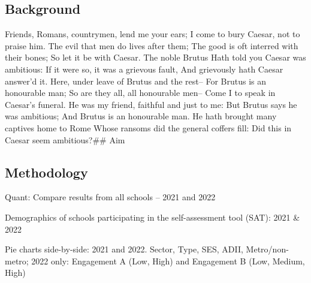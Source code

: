 \documentclass[
  letterpaper,
  DIV=11,
  numbers=noendperiod]{scrartcl}
\begin{document}
\hypertarget{background}{%
\subsection{Background}\label{background}}

Friends, Romans, countrymen, lend me your ears; I come to bury Caesar,
not to praise him. The evil that men do lives after them; The good is
oft interred with their bones; So let it be with Caesar. The noble
Brutus Hath told you Caesar was ambitious: If it were so, it was a
grievous fault, And grievously hath Caesar answer'd it. Here, under
leave of Brutus and the rest-- For Brutus is an honourable man; So are
they all, all honourable men-- Come I to speak in Caesar's funeral. He
was my friend, faithful and just to me: But Brutus says he was
ambitious; And Brutus is an honourable man. He hath brought many
captives home to Rome Whose ransoms did the general coffers fill: Did
this in Caesar seem ambitious?\#\# Aim

\hypertarget{methodology}{%
\subsection{Methodology}\label{methodology}}

Quant: Compare results from all schools -- 2021 and 2022

Demographics of schools participating in the self-assessment tool (SAT):
2021 \& 2022

Pie charts side-by-side: 2021 and 2022. Sector, Type, SES, ADII,
Metro/non-metro; 2022 only: Engagement A (Low, High) and Engagement B
(Low, Medium, High)
\end{document}
